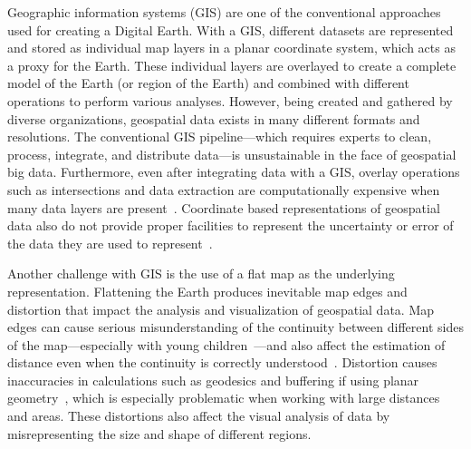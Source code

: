 Geographic information systems (GIS) are one of the conventional approaches used for creating a Digital Earth.
With a GIS, different datasets are represented and stored as individual map layers in a planar coordinate system, which acts as a proxy for the Earth.
These individual layers are overlayed to create a complete model of the Earth (or region of the Earth) and combined with different operations to perform various analyses.
However, being created and gathered by diverse organizations, geospatial data exists in many different formats and resolutions.
The conventional GIS pipeline---which requires experts to clean, process, integrate, and distribute data---is unsustainable in the face of geospatial big data.
Furthermore, even after integrating data with a GIS, overlay operations such as intersections and data extraction are computationally expensive when many data layers are present~\cite{wang2015improving}.
Coordinate based representations of geospatial data also do not provide proper facilities to represent the uncertainty or error of the data they are used to represent~\cite{goodchild2018reimagining}.


Another challenge with GIS is the use of a flat map as the underlying representation.
Flattening the Earth produces inevitable map edges and distortion that impact the analysis and visualization of geospatial data.
Map edges can cause serious misunderstanding of the continuity between different sides of the map---especially with young children~\cite{hennerdal2015beyond}---and also affect the estimation of distance even when the continuity is correctly understood~\cite{hruby2016journey}.
Distortion causes inaccuracies in calculations such as geodesics and buffering if using planar geometry~\cite{flaterbuffering}, which is especially problematic when working with large distances and areas.
These distortions also affect the visual analysis of data by misrepresenting the size and shape of different regions.


